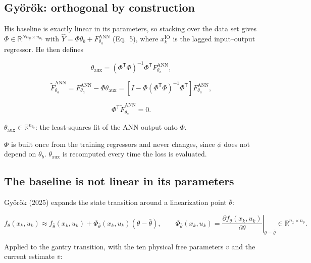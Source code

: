 \documentclass[12pt]{article}
\newcommand{\R}{\mathbb{R}}
\newcommand{\T}{\mathsf{T}}
\newcommand{\ANN}{\mathrm{ANN}}
\newcommand{\xio}{x_k^{\mathrm{IO}}}
\newcommand{\thaux}{\theta_{\mathrm{aux}}}
\newcommand{\panel}[1]{\subsection*{\Large #1}\vspace{1mm}}
\begin{document}
\panel{Gy\"or\"ok: orthogonal by construction}

His baseline is exactly linear in its parameters, so stacking over the data
set gives $\Phi\in\R^{Nn_y\times n_{\theta_b}}$ with $\widehat Y=\Phi\theta_b
+F^{\ANN}_{\theta_a}$ (Eq.~5), where $\xio$ is the lagged input--output
regressor. He then defines

\begin{equation*}
\thaux=\left(\Phi^{\T}\Phi\right)^{-1}\Phi^{\T}F^{\ANN}_{\theta_a},
\tag{Eq.~8}
\end{equation*}

\vspace{-2mm}
\begin{equation*}
\widetilde F^{\ANN}_{\theta_a}
=F^{\ANN}_{\theta_a}-\Phi\thaux
=\left[I-\Phi\left(\Phi^{\T}\Phi\right)^{-1}\Phi^{\T}\right]F^{\ANN}_{\theta_a},
\tag{Eq.~10}
\end{equation*}

\vspace{-2mm}
\begin{equation*}
\Phi^{\T}\widetilde F^{\ANN}_{\theta_a}=0 .
\tag{Lemma~3, Eq.~11}
\end{equation*}

$\thaux\in\R^{n_{\theta_b}}$: the least-squares fit of the ANN output onto
$\Phi$.

\vspace{1mm}
$\Phi$ is built once from the training regressors and never changes, since
$\phi$ does not depend on $\theta_b$. $\thaux$ is recomputed every time the
loss is evaluated.

\newpage
\panel{The baseline is not linear in its parameters}

Gy\"or\"ok (2025) expands the state transition around a linearization point
$\bar\theta$:

\begin{equation*}
f_\theta(x_k,u_k)\approx f_{\bar\theta}(x_k,u_k)
+\Phi_{\bar\theta}(x_k,u_k)\left(\theta-\bar\theta\right),
\qquad
\Phi_{\bar\theta}(x_k,u_k)
=\left.\frac{\partial f_\theta(x_k,u_k)}{\partial\theta}\right|_{\theta=\bar\theta}
\in\R^{n_x\times n_\theta}.
\tag{Eq.~15}
\end{equation*}

Applied to the gantry transition, with the ten physical free parameters $v$ and
the current estimate $\bar v$:
\end{document}
